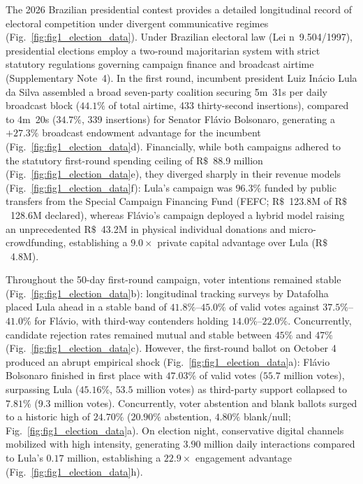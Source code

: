 \documentclass[11pt,a4paper]{article}
\begin{document}
The 2026 Brazilian presidential contest provides a detailed longitudinal record of electoral competition under divergent communicative regimes (Fig.~\ref{fig:fig1_election_data}). Under Brazilian electoral law (Lei n\textordmasculine~9.504/1997), presidential elections employ a two-round majoritarian system with strict statutory regulations governing campaign finance and broadcast airtime (Supplementary Note~4). In the first round, incumbent president Luiz Inácio Lula da Silva assembled a broad seven-party coalition securing 5m~31s per daily broadcast block ($44.1\%$ of total airtime, 433 thirty-second insertions), compared to 4m~20s ($34.7\%$, 339 insertions) for Senator Flávio Bolsonaro, generating a $+27.3\%$ broadcast endowment advantage for the incumbent (Fig.~\ref{fig:fig1_election_data}d). Financially, while both campaigns adhered to the statutory first-round spending ceiling of $\mathrm{R}\$$~88.9 million (Fig.~\ref{fig:fig1_election_data}e), they diverged sharply in their revenue models (Fig.~\ref{fig:fig1_election_data}f): Lula's campaign was $96.3\%$ funded by public transfers from the Special Campaign Financing Fund (FEFC; $\mathrm{R}\$$~123.8M of $\mathrm{R}\$$~128.6M declared), whereas Flávio's campaign deployed a hybrid model raising an unprecedented $\mathrm{R}\$$~43.2M in physical individual donations and micro-crowdfunding, establishing a $9.0\times$ private capital advantage over Lula ($\mathrm{R}\$$~4.8M).

Throughout the 50-day first-round campaign, voter intentions remained stable (Fig.~\ref{fig:fig1_election_data}b): longitudinal tracking surveys by Datafolha placed Lula ahead in a stable band of $41.8\%$--$45.0\%$ of valid votes against $37.5\%$--$41.0\%$ for Flávio, with third-way contenders holding $14.0\%$--$22.0\%$. Concurrently, candidate rejection rates remained mutual and stable between $45\%$ and $47\%$ (Fig.~\ref{fig:fig1_election_data}c). However, the first-round ballot on October 4 produced an abrupt empirical shock (Fig.~\ref{fig:fig1_election_data}a): Flávio Bolsonaro finished in first place with $47.03\%$ of valid votes ($55.7$ million votes), surpassing Lula ($45.16\%$, $53.5$ million votes) as third-party support collapsed to $7.81\%$ ($9.3$ million votes). Concurrently, voter abstention and blank ballots surged to a historic high of $24.70\%$ ($20.90\%$ abstention, $4.80\%$ blank/null; Fig.~\ref{fig:fig1_election_data}a). On election night, conservative digital channels mobilized with high intensity, generating $3.90$ million daily interactions compared to Lula's $0.17$ million, establishing a $22.9\times$ engagement advantage (Fig.~\ref{fig:fig1_election_data}h).
\end{document}
